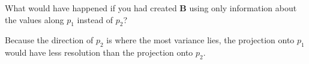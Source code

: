 What would have happened if you had created $\boldsymbol{B}$ using only information about the values along $p_1$ instead of $p_2$?

\begin{solution}
    Because the direction of $p_2$ is where the most variance lies, the projection onto $p_1$ would have less resolution than the projection onto $p_2$.
\end{solution}